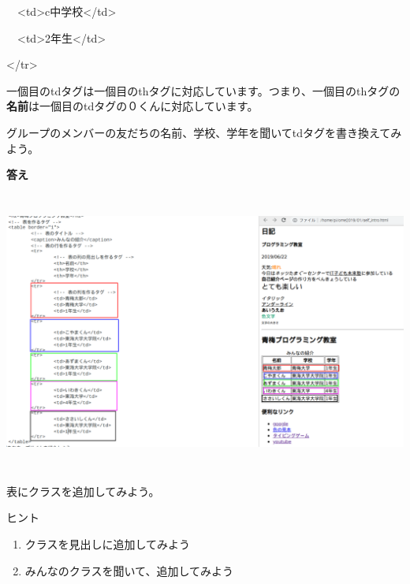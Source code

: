 \documentclass[a4paper,12pt]{jarticle}
\begin{document}
\ \ {\textless}td{\textgreater}c中学校{\textless}/td{\textgreater}

\ \ {\textless}td{\textgreater}2年生{\textless}/td{\textgreater}

{\textless}/tr{\textgreater}

一個目のtdタグは一個目のthタグに対応しています。つまり、一個目のthタグの\textbf{名前}は一個目のtdタグの０くんに対応しています。


\bigskip


\bigskip

グループのメンバーの友だちの名前、学校、学年を聞いてtdタグを書き換えてみよう。


\bigskip


\bigskip



\bigskip

\clearpage
\textbf{答え}




\bigskip


\bigskip


\bigskip
\includegraphics[width=15.861cm,height=9.245cm]{textbook-img192.png}




\bigskip

\bigskip

\bigskip

\theQuestion

表にクラスを追加してみよう。

ヒント

\begin{enumerate}
  \item クラスを見出しに追加してみよう
  \item
        みんなのクラスを聞いて、追加してみよう
\end{enumerate}
\theQuestion
\end{document}
